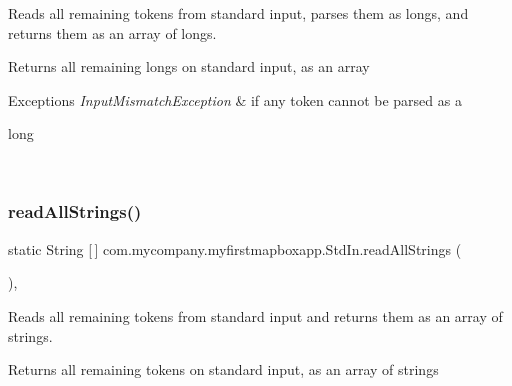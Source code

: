 Reads all remaining tokens from standard input, parses them as longs, and returns them as an array of longs. \begin{DoxyReturn}{Returns}
all remaining longs on standard input, as an array 
\end{DoxyReturn}

\begin{DoxyExceptions}{Exceptions}
{\em Input\+Mismatch\+Exception} & if any token cannot be parsed as a
\begin{DoxyCode}
\textcolor{keywordtype}{long} 
\end{DoxyCode}
 \\
\hline
\end{DoxyExceptions}
\mbox{\label{classcom_1_1mycompany_1_1myfirstmapboxapp_1_1_std_in_a7dc66044f2b746221de594ad33c84633}} 
\subsubsection{\texorpdfstring{read\+All\+Strings()}{readAllStrings()}}
{\footnotesize\ttfamily static String \mbox{[}$\,$\mbox{]} com.\+mycompany.\+myfirstmapboxapp.\+Std\+In.\+read\+All\+Strings (\begin{DoxyParamCaption}{ }\end{DoxyParamCaption})\hspace{0.3cm}{\ttfamily [inline]}, {\ttfamily [static]}}

Reads all remaining tokens from standard input and returns them as an array of strings.

\begin{DoxyReturn}{Returns}
all remaining tokens on standard input, as an array of strings 
\end{DoxyReturn}
\mbox{\label{classcom_1_1mycompany_1_1myfirstmapboxapp_1_1_std_in_a5a31cc7a45f67f39235ed51fe340b847}} 
